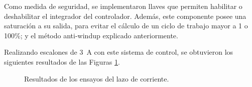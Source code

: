Como medida de seguridad, se implementaron llaves que permiten habilitar o deshabilitar el integrador del controlador. Además, este componente posee una saturación a su salida, para evitar el cálculo de un ciclo de trabajo mayor a 1 o 100\%; y el método anti-windup explicado anteriormente.

Realizando escalones de \SI{3}{\ampere} con este sistema de control, se obtuvieron los siguientes resultados de las Figuras \ref{escalones-lazo-corriente}.

\begin{figure}[hbt!]
    \centering
    \caption{Resultados de los ensayos del lazo de corriente.}
    \label{escalones-lazo-corriente}

  \end{figure}



\newpage